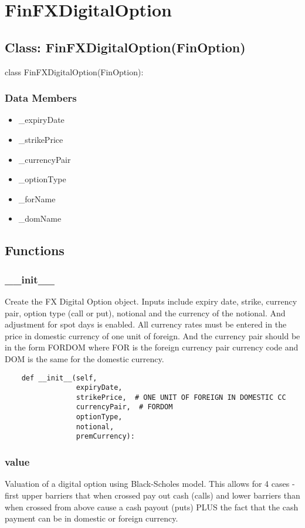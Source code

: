 \documentclass[twoside,11pt]{book}
\begin{document}
\newpage
\section{FinFXDigitalOption}

\subsection*{Class: FinFXDigitalOption(FinOption)}
class FinFXDigitalOption(FinOption): 

\subsubsection*{Data Members}
\begin{itemize}
\item{\_expiryDate}
\item{\_strikePrice}
\item{\_currencyPair}
\item{\_optionType}
\item{\_forName}
\item{\_domName}
\end{itemize}

\subsection*{Functions}

\subsubsection*{{\bf \_\_init\_\_}}
Create the FX Digital Option object. Inputs include expiry date, strike, currency pair, option type (call or put), notional and the currency of the notional. And adjustment for spot days is enabled. All currency rates must be entered in the price in domestic currency of one unit of foreign. And the currency pair should be in the form FORDOM where FOR is the foreign currency pair currency code and DOM is the same for the domestic currency.  

\begin{lstlisting}
    def __init__(self,
                 expiryDate,
                 strikePrice,  # ONE UNIT OF FOREIGN IN DOMESTIC CC
                 currencyPair,  # FORDOM
                 optionType,
                 notional,
                 premCurrency):
\end{lstlisting}

\subsubsection*{{\bf value}}
Valuation of a digital option using Black-Scholes model. This allows for 4 cases - first upper barriers that when crossed pay out cash (calls) and lower barriers than when crossed from above cause a cash payout (puts) PLUS the fact that the cash payment can be in domestic or foreign currency.  
\end{document}
